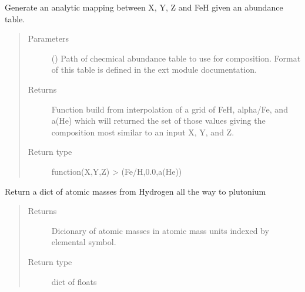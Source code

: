 \documentclass[letterpaper,10pt,english]{sphinxmanual}
\begin{document}
\begin{fulllineitems}
\label{\detokenize{pyTOPSScrape.parse:pyTOPSScrape.parse.abundance.gen_abun_map}}
\sphinxAtStartPar
Generate an analytic mapping between X, Y, Z and FeH given an abundance
table.
\begin{quote}\begin{description}
\item[{Parameters}] \leavevmode
\sphinxAtStartPar
{} () \textendash{} Path of checmical abundance table to use for composition. Format of
this table is defined in the ext module documentation.

\item[{Returns}] \leavevmode
\sphinxAtStartPar
{} \textendash{} Function build from interpolation of a grid of FeH, alpha/Fe, and
a(He) which will returned the set of those values giving the
composition most similar to an input X, Y, and Z.

\item[{Return type}] \leavevmode
\sphinxAtStartPar
function(X,Y,Z) \sphinxhyphen{}\textgreater{} (Fe/H,0.0,a(He))

\end{description}\end{quote}

\end{fulllineitems}


\begin{fulllineitems}
\label{\detokenize{pyTOPSScrape.parse:pyTOPSScrape.parse.abundance.get_atomic_masses}}
\sphinxAtStartPar
Return a dict of atomic masses from Hydrogen all the way to plutonium
\begin{quote}\begin{description}
\item[{Returns}] \leavevmode
\sphinxAtStartPar
{} \textendash{} Dicionary of atomic masses in atomic mass units indexed by elemental
symbol.

\item[{Return type}] \leavevmode
\sphinxAtStartPar
dict of floats

\end{description}\end{quote}

\end{fulllineitems}
\end{document}
